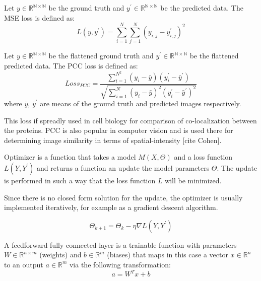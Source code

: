 \begin{definition}
	Let $y \in \mathbb{R^{N \times N}}$ be the ground truth and $y^\prime \in \mathbb{R^{N \times N}}$ be the predicted data. The MSE loss is defined as:
	\begin{equation}
		L(y, y^\prime) = \sum_{i=1}^{N} \sum_{j=1}^{N} (y_{i, j} - y_{i, j}^\prime)^2
	\end{equation}
\end{definition}

\begin{definition}
	Let $y \in \mathbb{R^{N \times N}}$ be the flattened ground truth and $y^\prime \in \mathbb{R^{N \times N}}$ be the flattened predicted data. The PCC loss is defined as:
	\begin{equation}
		Loss_{PCC} = \frac{\sum_{i=1}^{N^2}{(y_i - \bar{y})(y_i^\prime - \bar{y}^\prime)}}{\sqrt{\sum_{i=1}^{N}{(y_i - \bar{y})^2(y_i^\prime - \bar{y}^\prime)^2}}}   
	\end{equation}
	where $\bar{y}$, $\bar{y}^\prime$ are means of the ground truth and predicted images respectively.
	
	This loss if spreadly used in cell biology for comparison of co-localization between the proteins. PCC is also popular in computer vision and is used there for determining image similarity in terms of spatial-intensity [cite Cohen].
\end{definition}

\begin{definition}[Optimizer]
	Optimizer is a function that takes a model $M(X, \Theta)$ and a loss function $L(Y, Y^\prime)$ and returns a function an update the model parameters $\Theta$. The update is performed in such a way that the loss function $L$ will be minimized. 
\end{definition}

Since there is no closed form solution for the update, the optimizer is usually implemented iteratively, for example as a gradient descent algorithm.

\begin{definition}
	\begin{equation}
		\Theta_{k+1} = \Theta_k - \eta \nabla L(Y, Y^\prime)
	\end{equation}
\end{definition}

\begin{definition}
	A feedforward fully-connected layer is a trainable function with parameters $W \in \mathbb{R}^{n \times m}$ (weights) and $b \in \mathbb{R}^{m}$ (biases) that maps in this case a vector $x \in \mathbb{R}^{n}$ to an output $a \in \mathbb{R}^{m}$ via the following transformation:
		\begin{equation}
			a = W^{T}x + b
		\end{equation}
\end{definition}

